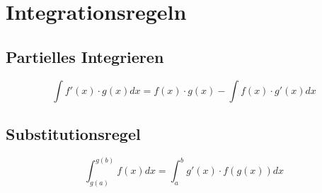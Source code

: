 \section{Integrationsregeln}
\subsection{Partielles Integrieren}
\[ \boxed{\int f'(x) \cdot g(x) dx = f(x) \cdot g(x) - \int f(x) \cdot g'(x) dx} \]
\subsection{Substitutionsregel}
\[ \boxed{\int_{g(a)}^{g(b)} f(x) dx = \int_{a}^{b} g'(x) \cdot f(g(x)) dx} \]

